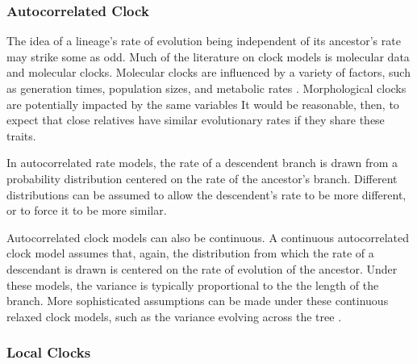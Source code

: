 \subsubsection{Autocorrelated Clock}
The idea of %
a lineage's rate of evolution being independent of its ancestor's rate may strike some as odd.
Much of the literature on clock models is  molecular data and molecular clocks.
Molecular clocks are influenced by a variety of factors, such as generation times, population sizes, and metabolic rates \citep{bromham1996, gaut1992,thomas2006,bromham2015}.
Morphological clocks are potentially impacted by the same variables %
It would be reasonable, then, to expect that close relatives have similar evolutionary rates if they share these traits.

In autocorrelated rate models, the rate of a descendent branch is drawn from a probability distribution \citep{Aris-Brosou2002} centered on the rate of the ancestor's branch.
Different distributions can be assumed to allow the descendent's rate to be more different, or to force it to be more similar.


Autocorrelated clock models can also be continuous.
A continuous autocorrelated clock model assumes that, again, the distribution from which the rate of a descendant is drawn is centered on the rate of evolution of the ancestor.
Under these models,  the variance is typically proportional to the the length of the branch.
More sophisticated assumptions can be made under these continuous  relaxed clock models, such as the variance  evolving across the tree \citep{Thorne1998, Kishino2001, Thorne2002, Aris-Brosou2002, Aris-Brosou2003}.

\subsubsection{Local Clocks}

